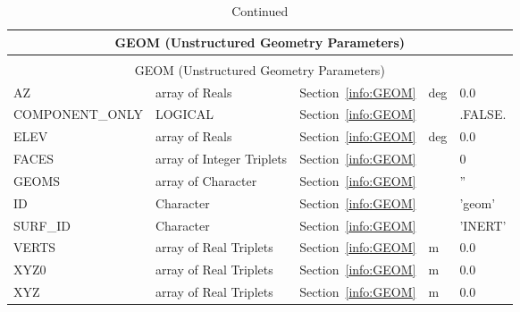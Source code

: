 \documentclass[12pt]{article}
\begin{document}
\begin{longtable}{@{\extracolsep{\fill}}|l|l|l|l|l|}
\caption[Unstructured geometry parameters ({\ct GEOM} namelist group)]{For more information see Section~\ref{info:GEOM}.}
\label{tbl:GEOM} \\
\hline
\multicolumn{5}{|c|}{{\ct GEOM} (Unstructured Geometry Parameters)} \\
\hline \hline
\endfirsthead
\caption[]{Continued} \\
\hline
\multicolumn{5}{|c|}{{\ct GEOM} (Unstructured Geometry Parameters)} \\
\hline \hline
\endhead
{\ct AZ}           & array of Reals                & Section~\ref{info:GEOM}            &  deg      &    0.0                   \\ \hline
{\ct COMPONENT\_ONLY}     & LOGICAL                & Section~\ref{info:GEOM}            &           &  {\ct .FALSE.}           \\ \hline
{\ct ELEV}         & array of Reals                & Section~\ref{info:GEOM}            &  deg      &    0.0                   \\ \hline
{\ct FACES}        & array of Integer Triplets     & Section~\ref{info:GEOM}            &           &    0                     \\ \hline
{\ct GEOMS}        & array of Character            & Section~\ref{info:GEOM}            &           &   {\ct ''}               \\ \hline
{\ct ID}           & Character                     & Section~\ref{info:GEOM}            &           &   {\ct 'geom'}           \\ \hline
{\ct SURF\_ID}     & Character                     & Section~\ref{info:GEOM}            &           &  {\ct 'INERT'}           \\ \hline
{\ct VERTS}        & array of Real Triplets        & Section~\ref{info:GEOM}            &   m       &   0.0                    \\ \hline
{\ct XYZ0}         & array of Real Triplets        & Section~\ref{info:GEOM}            &   m       &   0.0                    \\ \hline
{\ct XYZ}          & array of Real Triplets        & Section~\ref{info:GEOM}            &   m       &   0.0                    \\ \hline

\end{longtable}


\vspace{\baselineskip}
\end{document}

